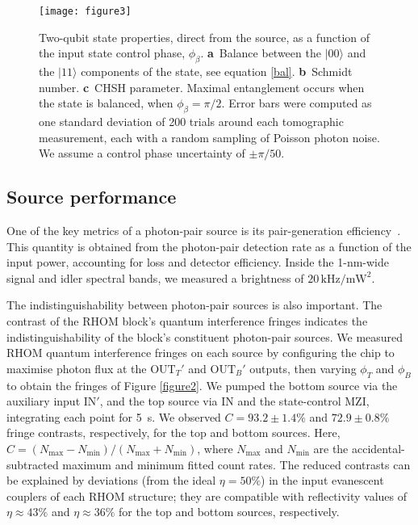 \documentclass[
twocolumn,
 amsmath,amssymb,
 aps,
  twoside,
 superscriptaddress,
pra,
longbibliography
]{revtex4-1}
\begin{document}
\begin{figure}[tbh!]
\centering
\texttt{[image: figure3]}
\caption{Two-qubit state properties, direct from the source, as a function of the input state control phase, $\phi_\beta$. \textbf{a}~Balance between the $|00\rangle$ and the $|11\rangle$ components of the state, see equation \eqref{bal}. \textbf{b}~Schmidt number. \textbf{c}~CHSH parameter. Maximal entanglement occurs when the state is balanced, when $\phi_\beta=\pi/2$. Error bars were computed as one standard deviation of 200 trials around each tomographic measurement, each with a random sampling of Poisson photon noise. We assume a control phase uncertainty of $\pm\pi/50$.}
\label{figure3}
\end{figure}


\subsection*{Source performance}

One of the key metrics of a photon-pair source is its pair-generation efficiency~\cite{Savanier:2016kb}. This quantity is obtained from the photon-pair detection rate as a function of the input power, accounting for loss and detector efficiency. Inside the 1-nm-wide signal and idler spectral bands, we measured a brightness of $20\, \mathrm{kHz}/ \mathrm{mW}^2$.

The indistinguishability between photon-pair sources is also important. The contrast of the RHOM block's quantum interference fringes indicates the indistinguishability of the block's constituent photon-pair sources. We measured RHOM quantum interference fringes on each source by configuring the chip to maximise photon flux at the $\mathrm{OUT}_T'$ and $\mathrm{OUT}_B'$ 
outputs, then varying $\phi_T$ and $\phi_B$ to obtain the fringes of Figure \ref{figure2}. We pumped the bottom source via the auxiliary input $\mathrm{IN}'$, and the top source via $\mathrm{IN}$ and the state-control MZI, integrating each point for 5~s. We observed $C = 93.2 \pm 1.4\%$ and $72.9 \pm 0.8\%$ fringe contrasts, respectively, for the top and bottom sources. Here, $C = (N_{\mathrm{max}}-N_{\mathrm{min}}) / (N_{\mathrm{max}} + N_{\mathrm{min}})$, where $N_{\mathrm{max}}$ and $N_{\mathrm{min}}$ are the accidental-subtracted maximum and minimum fitted count rates. The reduced contrasts can be explained by deviations (from the ideal $\eta = 50\%$) in the input evanescent couplers of each RHOM structure; they are compatible with  reflectivity values of $\eta \approx 43 \%$ and  $\eta \approx 36 \%$ for the top and bottom sources, respectively.
\end{document}
